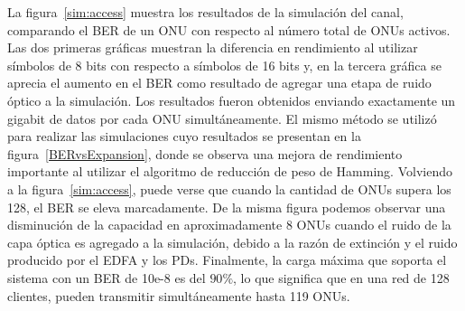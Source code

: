 La figura~\ref{sim:access} muestra los resultados de la simulación del canal, comparando el BER de un ONU con respecto al número total de ONUs activos. Las dos primeras gráficas muestran la diferencia en rendimiento al utilizar símbolos de 8 bits con respecto a símbolos de 16 bits y, en la tercera gráfica se aprecia el aumento en el BER como resultado de agregar una etapa de ruido óptico a la simulación.
Los resultados fueron obtenidos enviando exactamente un gigabit de datos por cada ONU simultáneamente. El mismo método se utilizó para realizar las simulaciones cuyo resultados se presentan en la figura~\ref{BERvsExpansion}, donde se observa una mejora de rendimiento importante al utilizar el algoritmo de reducción de peso de Hamming.
Volviendo a la figura~\ref{sim:access}, puede verse que cuando la cantidad de ONUs supera los 128, el BER se eleva marcadamente.
De la misma figura podemos observar una disminución de la capacidad en aproximadamente $8$ ONUs cuando el ruido de la capa óptica es agregado a la simulación, debido a la razón de extinción y el ruido producido por el EDFA y los PDs.
Finalmente, la carga máxima que soporta el sistema con un BER de 10e-8 es del $90\%$, lo que significa que en una red de 128 clientes, pueden transmitir simultáneamente hasta 119 ONUs.



